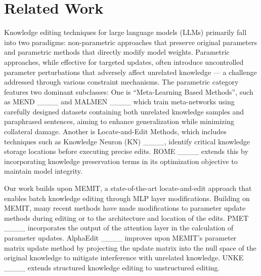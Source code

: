 \section{Related Work}
\label{sec:appendix_related_work}


Knowledge editing techniques for large language models (LLMs) primarily fall into two paradigms: non-parametric approaches that preserve original parameters and parametric methods that directly modify model weights. Parametric approaches, while effective for targeted updates, often introduce uncontrolled parameter perturbations that adversely affect unrelated knowledge --- a challenge addressed through various constraint mechanisms.
The parametric category features two dominant subclasses: One is ``Meta-Learning Based Methods'', such as MEND ____ and MALMEN ____ which train meta-networks using carefully designed datasets containing both unrelated knowledge samples and paraphrased sentences, aiming to enhance generalization while minimizing collateral damage. Another is Locate-and-Edit Methods, which includes techniques such as Knowledge Neuron (KN) ____, identify critical knowledge storage locations before executing precise edits. ROME ____ extends this by incorporating knowledge preservation terms in its optimization objective to maintain model integrity.

Our work builds upon MEMIT, a state-of-the-art locate-and-edit approach that enables batch knowledge editing through MLP layer modifications. Building on MEMIT, many recent methods have made modifications to parameter update methods during editing or to the architecture and location of the edits. PMET ____ incorporates the output of the attention layer in the calculation of parameter updates. AlphaEdit ____ improves upon MEMIT's parameter matrix update method by projecting the update matrix into the null space of the original knowledge to mitigate interference with unrelated knowledge. UNKE ____ extends structured knowledge editing to unstructured editing.